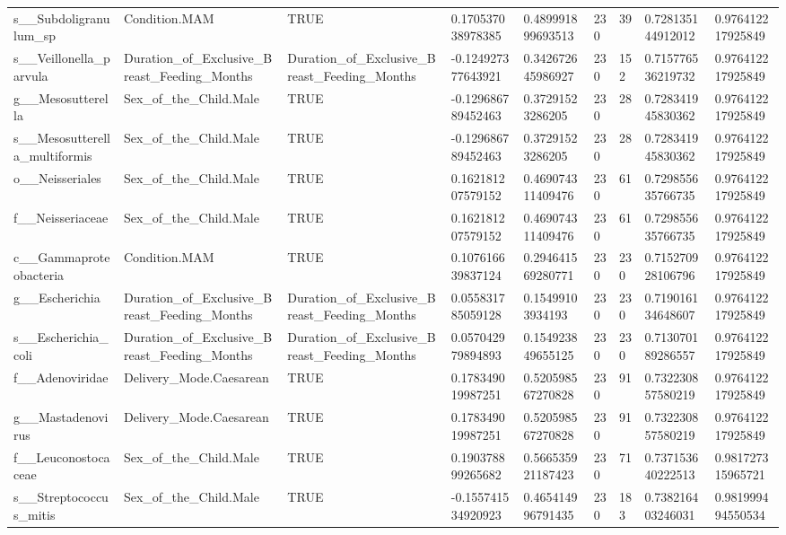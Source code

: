 \begin{longtable}{lllllllll}
s\_\_Subdoligranulum\_sp & Condition.MAM & TRUE & 0.170537038978385 & 0.489991899693513 & 230 & 39 & 0.728135144912012 & 0.976412217925849 \\
s\_\_Veillonella\_parvula & Duration\_of\_Exclusive\_Breast\_Feeding\_Months & Duration\_of\_Exclusive\_Breast\_Feeding\_Months & -0.124927377643921 & 0.342672645986927 & 230 & 152 & 0.715776536219732 & 0.976412217925849 \\
g\_\_Mesosutterella & Sex\_of\_the\_Child.Male & TRUE & -0.129686789452463 & 0.37291523286205 & 230 & 28 & 0.728341945830362 & 0.976412217925849 \\
s\_\_Mesosutterella\_multiformis & Sex\_of\_the\_Child.Male & TRUE & -0.129686789452463 & 0.37291523286205 & 230 & 28 & 0.728341945830362 & 0.976412217925849 \\
o\_\_Neisseriales & Sex\_of\_the\_Child.Male & TRUE & 0.162181207579152 & 0.469074311409476 & 230 & 61 & 0.729855635766735 & 0.976412217925849 \\
f\_\_Neisseriaceae & Sex\_of\_the\_Child.Male & TRUE & 0.162181207579152 & 0.469074311409476 & 230 & 61 & 0.729855635766735 & 0.976412217925849 \\
c\_\_Gammaproteobacteria & Condition.MAM & TRUE & 0.107616639837124 & 0.294641569280771 & 230 & 230 & 0.715270928106796 & 0.976412217925849 \\
g\_\_Escherichia & Duration\_of\_Exclusive\_Breast\_Feeding\_Months & Duration\_of\_Exclusive\_Breast\_Feeding\_Months & 0.055831785059128 & 0.15499103934193 & 230 & 230 & 0.719016134648607 & 0.976412217925849 \\
s\_\_Escherichia\_coli & Duration\_of\_Exclusive\_Breast\_Feeding\_Months & Duration\_of\_Exclusive\_Breast\_Feeding\_Months & 0.057042979894893 & 0.154923849655125 & 230 & 230 & 0.713070189286557 & 0.976412217925849 \\
f\_\_Adenoviridae & Delivery\_Mode.Caesarean & TRUE & 0.178349019987251 & 0.520598567270828 & 230 & 91 & 0.732230857580219 & 0.976412217925849 \\
g\_\_Mastadenovirus & Delivery\_Mode.Caesarean & TRUE & 0.178349019987251 & 0.520598567270828 & 230 & 91 & 0.732230857580219 & 0.976412217925849 \\
f\_\_Leuconostocaceae & Sex\_of\_the\_Child.Male & TRUE & 0.190378899265682 & 0.566535921187423 & 230 & 71 & 0.737153640222513 & 0.981727315965721 \\
s\_\_Streptococcus\_mitis & Sex\_of\_the\_Child.Male & TRUE & -0.155741534920923 & 0.465414996791435 & 230 & 183 & 0.738216403246031 & 0.981999494550534 \\

\end{longtable}
